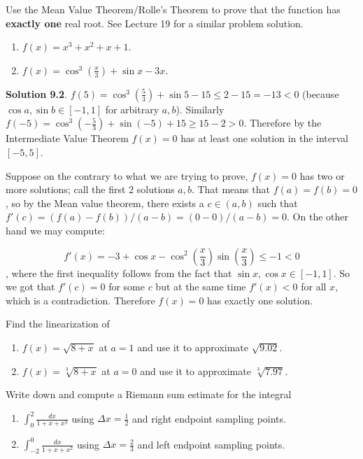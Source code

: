 \documentclass{article}
\begin{document}
\begin{problem}
Use the Mean Value Theorem/Rolle's Theorem to prove that the function has \textbf{exactly one} real root. See Lecture 19 for a similar problem solution.
\begin{enumerate}
\item $f(x)= x^3 +x^2+x+1$.
\item $f(x)=\cos^3 \left({\frac{x}{3}}\right) +\sin x-  3x$.
\end{enumerate}

\end{problem}
\textbf{Solution 9.2}. $f(5)=\cos^3\left(\frac{5}{3}\right) +\sin 5-15 \leq 2-15=-13<0 $ (because $\cos a, \sin b\in [-1,1]$ for arbitrary $a,b$). Similarly $f(-5)=\cos^3\left(-\frac{5}{3}\right) +\sin (-5)+15 \geq 15-2>0$. Therefore by the Intermediate Value Theorem $f(x)=0$ has at least one solution in the interval $[-5,5]$.

Suppose on the contrary to what we are trying to prove, $f(x)=0$ has two or more solutions; call the first 2 solutions $a,b$. That means that $f(a)=f(b)=0$, so by the Mean value theorem, there exists a $c\in (a,b)$ such that $f'(c)=(f(a)-f(b))/(a-b)=(0-0)/(a-b)=0$. On the other hand we may compute:

$$ f'(x)=-3+\cos x-\cos^{2}\left(\frac{x}3\right)\sin\left(\frac{x}{3}\right) \leq -1<0 $$, where the first inequality follows from the fact that $\sin x,\cos x\in [-1,1]$. So we got that $f'(c)=0$ for some $c$ but at the same time $f'(x)<0$ for all $x$, which is a contradiction. Therefore $f(x)=0$ has exactly one solution. 

\begin{problem}
Find the linearization of
\begin{enumerate}
\item $f(x)=\sqrt{8+x}$ at $a=1$ and use it to approximate $\sqrt{9.02}$.

\item $f(x)=\sqrt[3]{8+x}$ at $a=0$ and use it to approximate $\sqrt[3] {7.97}$.

\end{enumerate}
\end{problem}
\begin{problem}
Write down and compute a Riemann sum estimate for the integral 
\begin{enumerate}
\item $\displaystyle\int_{0}^2 \frac{dx}{1+x+x^3}$ using $\Delta x=\frac{1}2 $ and right endpoint sampling points.
\item $\displaystyle\int_{-2}^{0} \frac{dx}{1+x+x^2}$ using $\Delta x=\frac23 $ and left endpoint sampling points.

\end{enumerate}
\end{problem}
\end{document}
